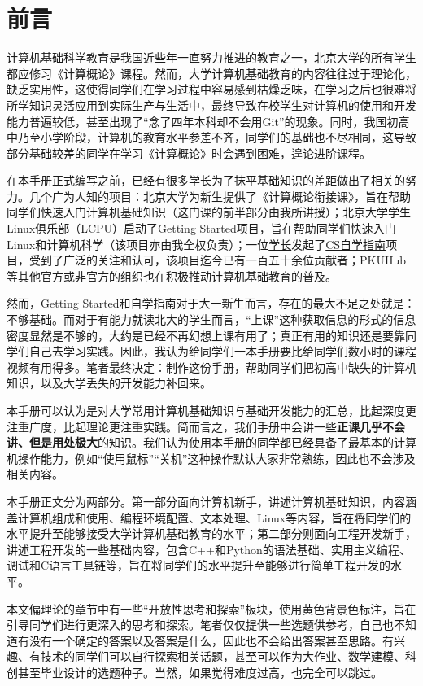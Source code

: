 \chapter{前言}

计算机基础科学教育是我国近些年一直努力推进的教育之一，北京大学的所有学生都应修习《计算概论》课程。然而，大学计算机基础教育的内容往往过于理论化，缺乏实用性，这使得同学们在学习过程中容易感到枯燥乏味，在学习之后也很难将所学知识灵活应用到实际生产与生活中，最终导致在校学生对计算机的使用和开发能力普遍较低，甚至出现了“念了四年本科却不会用Git”的现象。同时，我国初高中乃至小学阶段，计算机的教育水平参差不齐，同学们的基础也不尽相同，这导致部分基础较差的同学在学习《计算概论》时会遇到困难，遑论进阶课程。

在本手册正式编写之前，已经有很多学长为了抹平基础知识的差距做出了相关的努力。几个广为人知的项目：北京大学为新生提供了《计算概论衔接课》，旨在帮助同学们快速入门计算机基础知识（这门课的前半部分由我所讲授）；北京大学学生Linux俱乐部（LCPU）启动了\href{missing.lcpu.dev}{Getting Started项目}，旨在帮助同学们快速入门Linux和计算机科学（该项目亦由我全权负责）；一位\faGithub\href{https://github.com/PKUFlyingPig}{学长}发起了\href{https://csdiy.wiki/}{CS自学指南}项目，受到了广泛的关注和认可，该项目迄今已有一百五十余位贡献者；PKUHub等其他官方或非官方的组织也在积极推动计算机基础教育的普及。

然而，Getting Started和自学指南对于大一新生而言，存在的最大不足之处就是：不够基础。而对于有能力就读北大的学生而言，“上课”这种获取信息的形式的信息密度显然是不够的，大约是已经不再幻想上课有用了；真正有用的知识还是要靠同学们自己去学习实践。因此，我认为给同学们一本手册要比给同学们数小时的课程视频有用得多。笔者最终决定：制作这份手册，帮助同学们把初高中缺失的计算机知识，以及大学丢失的开发能力补回来。

本手册可以认为是对大学常用计算机基础知识与基础开发能力的汇总，比起深度更注重广度，比起理论更注重实践。简而言之，我们手册中会讲一些\textbf{正课几乎不会讲、但是用处极大}的知识。我们认为使用本手册的同学都已经具备了最基本的计算机操作能力，例如“使用鼠标”“关机”这种操作默认大家非常熟练，因此也不会涉及相关内容。

本手册正文分为两部分。第一部分面向计算机新手，讲述计算机基础知识，内容涵盖计算机组成和使用、编程环境配置、文本处理、Linux等内容，旨在将同学们的水平提升至能够接受大学计算机基础教育的水平；第二部分则面向工程开发新手，讲述工程开发的一些基础内容，包含C++和Python的语法基础、实用主义编程、调试和C语言工具链等，旨在将同学们的水平提升至能够进行简单工程开发的水平。

本文偏理论的章节中有一些“开放性思考和探索”板块，使用黄色背景色标注，旨在引导同学们进行更深入的思考和探索。笔者仅仅提供一些选题供参考，自己也不知道有没有一个确定的答案以及答案是什么，因此也不会给出答案甚至思路。有兴趣、有技术的同学们可以自行探索相关话题，甚至可以作为大作业、数学建模、科创甚至毕业设计的选题种子。当然，如果觉得难度过高，也完全可以跳过。

